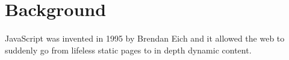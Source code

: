 \documentclass[
10pt, %
a4paper, %
oneside, %
headinclude,footinclude, %
BCOR5mm, %
]{scrartcl}
\begin{document}

{\let\thefootnote\relax{}}
\newpage %

\section{Background}
\paragraph{}
JavaScript was invented in 1995 by Brendan Eich and it allowed the web to suddenly go from lifeless static pages to in depth dynamic content.
 
\cite{Kambona}
\cite{youtube}
\cite{angularbook}

\newpage %

\renewcommand{\refname}{\spacedlowsmallcaps{References}} %




\end{document}
